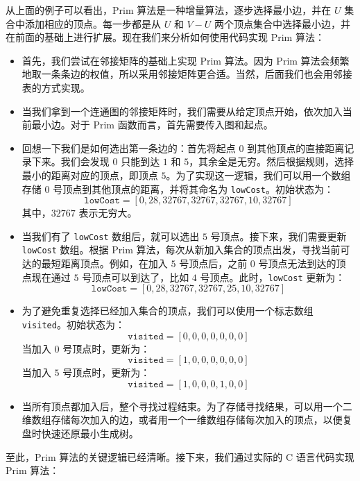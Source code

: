 \documentclass[lang=cn,newtx,10pt,scheme=chinese]{elegantbook}
\begin{document}
从上面的例子可以看出，Prim 算法是一种增量算法，逐步选择最小边，并在 $U$ 集合中添加相应的顶点。每一步都是从 $U$ 和 $V-U$ 两个顶点集合中选择最小边，并在前面的基础上进行扩展。现在我们来分析如何使用代码实现 Prim 算法：

\begin{itemize}
  \item 首先，我们尝试在邻接矩阵的基础上实现 Prim 算法。因为 Prim 算法会频繁地取一条条边的权值，所以采用邻接矩阵更合适。当然，后面我们也会用邻接表的方式实现。
  
  \item 当我们拿到一个连通图的邻接矩阵时，我们需要从给定顶点开始，依次加入当前最小边。对于 Prim 函数而言，首先需要传入图和起点。

  \item 回想一下我们是如何选出第一条边的：首先将起点 $0$ 到其他顶点的直接距离记录下来。我们会发现 $0$ 只能到达 $1$ 和 $5$，其余全是无穷。然后根据规则，选择最小的距离对应的顶点，即顶点 $5$。为了实现这一逻辑，我们可以用一个数组存储 $0$ 号顶点到其他顶点的距离，并将其命名为 \texttt{lowCost}。初始状态为：
  \[
  \texttt{lowCost} = [0, 28, 32767, 32767, 32767, 10, 32767]
  \]
  其中，$32767$ 表示无穷大。

  \item 当我们有了 \texttt{lowCost} 数组后，就可以选出 $5$ 号顶点。接下来，我们需要更新 \texttt{lowCost} 数组。根据 Prim 算法，每次从新加入集合的顶点出发，寻找当前可达的最短距离顶点。例如，在加入 $5$ 号顶点后，之前 $0$ 号顶点无法到达的顶点现在通过 $5$ 号顶点可以到达了，比如 $4$ 号顶点。此时，\texttt{lowCost} 更新为：
  \[
  \texttt{lowCost} = [0, 28, 32767, 32767, 25, 10, 32767]
  \]

  \item 为了避免重复选择已经加入集合的顶点，我们可以使用一个标志数组 \texttt{visited}。初始状态为：
  \[
  \texttt{visited} = [0, 0, 0, 0, 0, 0, 0]
  \]
  当加入 $0$ 号顶点时，更新为：
  \[
  \texttt{visited} = [1, 0, 0, 0, 0, 0, 0]
  \]
  当加入 $5$ 号顶点时，更新为：
  \[
  \texttt{visited} = [1, 0, 0, 0, 1, 0, 0]
  \]

  \item 当所有顶点都加入后，整个寻找过程结束。为了存储寻找结果，可以用一个二维数组存储每次加入的边，或者用一个一维数组存储每次加入的顶点，以便复盘时快速还原最小生成树。
\end{itemize}

至此，Prim 算法的关键逻辑已经清晰。接下来，我们通过实际的 C 语言代码实现 Prim 算法：
\end{document}
